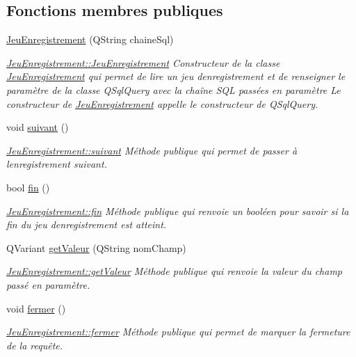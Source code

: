\subsection*{Fonctions membres publiques}
\begin{DoxyCompactItemize}
\item 
\hyperlink{class_jeu_enregistrement_ab7f4141f74961ae1d5060c6d19fae366}{Jeu\+Enregistrement} (Q\+String chaine\+Sql)
\begin{DoxyCompactList}\small\item\em \hyperlink{class_jeu_enregistrement_ab7f4141f74961ae1d5060c6d19fae366}{Jeu\+Enregistrement\+::\+Jeu\+Enregistrement} Constructeur de la classe \hyperlink{class_jeu_enregistrement}{Jeu\+Enregistrement} qui permet de lire un jeu d\textquotesingle{}enregistrement et de renseigner le paramètre de la classe Q\+Sql\+Query avec la chaîne S\+QL passées en paramètre Le constructeur de \hyperlink{class_jeu_enregistrement}{Jeu\+Enregistrement} appelle le constructeur de Q\+Sql\+Query. \end{DoxyCompactList}\item 
void \hyperlink{class_jeu_enregistrement_a4ac6b1c725cbb52f5320c514b7d65b71}{suivant} ()
\begin{DoxyCompactList}\small\item\em \hyperlink{class_jeu_enregistrement_a4ac6b1c725cbb52f5320c514b7d65b71}{Jeu\+Enregistrement\+::suivant} Méthode publique qui permet de passer à l\textquotesingle{}enregistrement suivant. \end{DoxyCompactList}\item 
bool \hyperlink{class_jeu_enregistrement_af8d23fbc407926e8578986a3e950bdd9}{fin} ()
\begin{DoxyCompactList}\small\item\em \hyperlink{class_jeu_enregistrement_af8d23fbc407926e8578986a3e950bdd9}{Jeu\+Enregistrement\+::fin} Méthode publique qui renvoie un booléen pour savoir si la fin du jeu d\textquotesingle{}enregistrement est atteint. \end{DoxyCompactList}\item 
Q\+Variant \hyperlink{class_jeu_enregistrement_aa19979b7af9747ae05e8e40f7747bbed}{get\+Valeur} (Q\+String nom\+Champ)
\begin{DoxyCompactList}\small\item\em \hyperlink{class_jeu_enregistrement_aa19979b7af9747ae05e8e40f7747bbed}{Jeu\+Enregistrement\+::get\+Valeur} Méthode publique qui renvoie la valeur du champ passé en paramètre. \end{DoxyCompactList}\item 
void \hyperlink{class_jeu_enregistrement_a25a6ae0b1b810abaeef0acb9876ecbaf}{fermer} ()
\begin{DoxyCompactList}\small\item\em \hyperlink{class_jeu_enregistrement_a25a6ae0b1b810abaeef0acb9876ecbaf}{Jeu\+Enregistrement\+::fermer} Méthode publique qui permet de marquer la fermeture de la requête. \end{DoxyCompactList}\end{DoxyCompactItemize}


